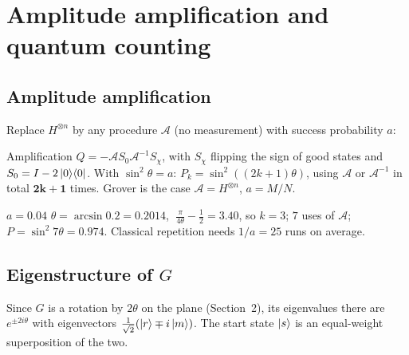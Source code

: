 \documentclass[11pt,a4paper,openany]{book}
\newcounter{wex}[section]
\newcommand{\proj}[1]{\ket{#1}\!\bra{#1}}
\begin{document}
\section{Amplitude amplification and quantum counting}
\subsection{Amplitude amplification}
Replace $H^{\otimes n}$ by any procedure $\mathcal{A}$ (no measurement) with success probability $a$:
\begin{keyres}{Amplification}
$Q = -\mathcal{A}S_0\mathcal{A}^{-1}S_\chi$, with $S_\chi$ flipping the sign of good states and $S_0 = I - 2\proj{0}$. With $\sin^2\theta = a$:
$P_k = \sin^2((2k+1)\theta)$, using $\mathcal{A}$ or $\mathcal{A}^{-1}$ in total $\mathbf{2k + 1}$ times. Grover is the case $\mathcal{A} = H^{\otimes n}$, $a = M/N$.
\end{keyres}
\begin{wexample}{$a = 0.04$}
$\theta = \arcsin0.2 = 0.2014$, $\;\frac{\pi}{4\theta} - \frac12 = 3.40$, so $k = 3$; $7$ uses of $\mathcal{A}$; $P = \sin^2 7\theta = 0.974$. Classical repetition needs $1/a = 25$ runs on average.
\end{wexample}

\subsection{Eigenstructure of $G$}
Since $G$ is a rotation by $2\theta$ on the plane (Section~2), its eigenvalues there are $e^{\pm2i\theta}$ with eigenvectors $\frac{1}{\sqrt2}(\ket{r} \mp i\ket{m})$. The start state $\ket{s}$ is an equal-weight superposition of the two.
\end{document}
